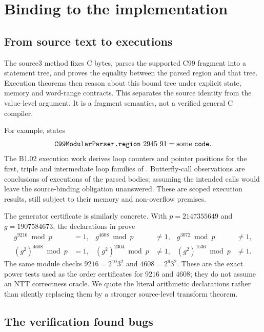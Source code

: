 \section{Binding to the implementation}\label{sec:binding}
\subsection{From source text to executions}
The source3 method fixes C bytes, parses the supported C99 fragment into
a statement tree, and proves the equality between the parsed region
and that tree. Execution theorems then reason about this bound tree
under explicit state, memory and word-range contracts. This separates
the source identity from the value-level argument. It is a fragment
semantics, not a verified general C compiler.

For example,  states
\[
 \code{C99ModularParser.region}\ 2945\ 91=\mathrm{some}\ \code{code}.
\]
The B1.02 execution work derives loop counters and pointer positions
for the first, triple and intermediate loop families of
. Butterfly-call observations are conclusions of
executions of the parsed bodies; assuming the intended calls would
leave the source-binding obligation unanswered. These are scoped
execution results, still subject to their memory and non-overflow
premises.

The generator certificate is similarly concrete. With
$p=2147355649$ and $g=1907584673$, the declarations in
 prove
\begin{align*}
 g^{9216}\bmod p&=1,&g^{4608}\bmod p&\ne1,&g^{3072}\bmod p&\ne1,\\
 (g^2)^{4608}\bmod p&=1,&(g^2)^{2304}\bmod p&\ne1,&
 (g^2)^{1536}\bmod p&\ne1.
\end{align*}
The same module checks $9216=2^{10}3^2$ and $4608=2^9 3^2$.
These are the exact power tests used as the order certificates for
$9216$ and $4608$; they do not assume an NTT correctness oracle.
We quote the literal arithmetic declarations rather than silently
replacing them by a stronger source-level transform theorem.

\subsection{The verification found bugs}
